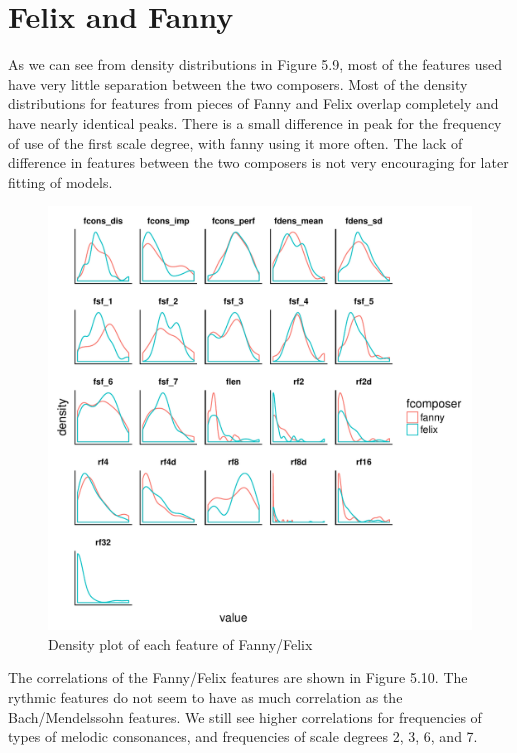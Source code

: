 \documentclass[12pt,twoside]{reedthesis}
\theoremstyle{definition}
\theoremstyle{definition}
\theoremstyle{definition}
\theoremstyle{remark}
\begin{document}
\section{Felix and Fanny}\label{felix-and-fanny}

As we can see from density distributions in Figure 5.9, most of the
features used have very little separation between the two composers.
Most of the density distributions for features from pieces of Fanny and
Felix overlap completely and have nearly identical peaks. There is a
small difference in peak for the frequency of use of the first scale
degree, with fanny using it more often. The lack of difference in
features between the two composers is not very encouraging for later
fitting of models.
\begin{figure}[H]
\centering
\includegraphics[scale = .5]{images/distribution_f.pdf}
\caption{Density plot of each feature of Fanny/Felix}
\label{subd}
\end{figure}
The correlations of the Fanny/Felix features are shown in Figure 5.10.
The rythmic features do not seem to have as much correlation as the
Bach/Mendelssohn features. We still see higher correlations for
frequencies of types of melodic consonances, and frequencies of scale
degrees 2, 3, 6, and 7.
\end{document}

